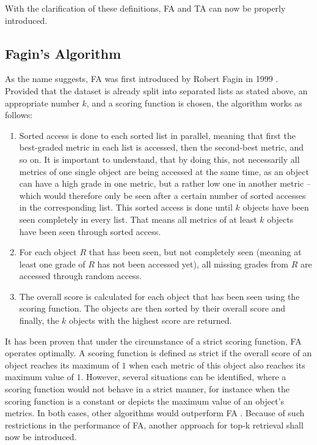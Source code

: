 With the clarification of these definitions, FA and TA can now be properly introduced.



\subsection{Fagin's Algorithm}

As the name suggests, FA was first introduced by Robert Fagin in 1999 \cite{fagin1999}. Provided that the dataset is already split into separated lists as stated above, an appropriate number $k$, and a scoring function is chosen, the algorithm works as follows:

\begin{enumerate}

\item Sorted access is done to each sorted list in parallel, meaning that first the best-graded metric in each list is accessed, then the second-best metric, and so on. It is important to understand, that by doing this, not necessarily all metrics of one single object are being accessed at the same time, as an object can have a high grade in one metric, but a rather low one in another metric – which would therefore only be seen after a certain number of sorted accesses in the corresponding list. This sorted access is done until $k$ objects have been seen completely in every list. That means all metrics of at least $k$ objects have been seen through sorted access. 

\item For each object $R$ that has been seen, but not completely seen (meaning at least one grade of $R$ has not been accessed yet), all missing grades from $R$ are accessed through random access. 

\item The overall score is calculated for each object that has been seen using the scoring function. The objects are then sorted by their overall score and finally, the $k$ objects with the highest score are returned. 

\end{enumerate}

It has been proven that under the circumstance of a strict scoring function, FA operates optimally. A scoring function is defined as strict if the overall score of an object reaches its maximum of $1$ when each metric of this object also reaches its maximum value of $1$. However, several situations can be identified, where a scoring function would not behave in a strict manner, for instance when the scoring function is a constant or depicts the maximum value of an object's metrics. In both cases, other algorithms would outperform FA \cite{fagin2002}. Because of such restrictions in the performance of FA, another approach for top-k retrieval shall now be introduced.


